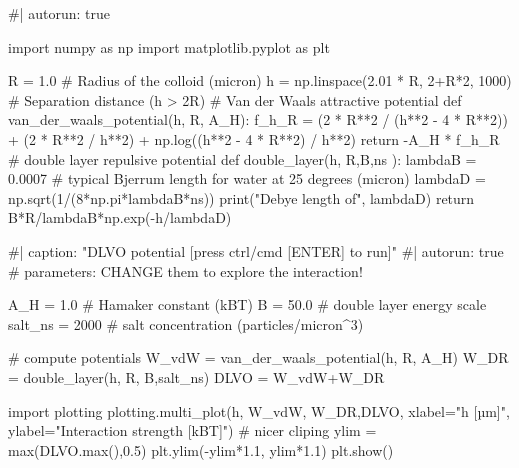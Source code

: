 \documentclass[
  letterpaper,
  enabledeprecatedfontcommands]{report}
\newenvironment{Shaded}{\begin{snugshade}}{\end{snugshade}}
\newcommand{\NormalTok}[1]{\textcolor[rgb]{0.00,0.23,0.31}{#1}}
\begin{document}
\begin{Shaded}
\begin{Highlighting}[]
\NormalTok{\#| autorun: true}

\NormalTok{import numpy as np}
\NormalTok{import matplotlib.pyplot as plt}

\NormalTok{R = 1.0  \# Radius of the colloid (micron) }
\NormalTok{h = np.linspace(2.01 * R, 2+R*2, 1000)  \# Separation distance (h \textgreater{} 2R)}
\NormalTok{\# Van der Waals attractive potential}
\NormalTok{def van\_der\_waals\_potential(h, R, A\_H):}
\NormalTok{    f\_h\_R = (2 * R**2 / (h**2 {-} 4 * R**2)) + (2 * R**2 / h**2) + np.log((h**2 {-} 4 * R**2) / h**2)}
\NormalTok{    return {-}A\_H * f\_h\_R}
\NormalTok{\# double layer repulsive potential}
\NormalTok{def double\_layer(h, R,B,ns ):}
\NormalTok{    lambdaB = 0.0007 \# typical Bjerrum length for water at 25 degrees (micron)}
\NormalTok{    lambdaD = np.sqrt(1/(8*np.pi*lambdaB*ns))}
\NormalTok{    print("Debye length of", lambdaD)}
\NormalTok{    return  B*R/lambdaB*np.exp({-}h/lambdaD)}

\end{Highlighting}
\end{Shaded}

\begin{Shaded}
\begin{Highlighting}[]
\NormalTok{\#| caption: "DLVO potential [press ctrl/cmd [ENTER] to run]"}
\NormalTok{\#| autorun: true}
\NormalTok{\# parameters: CHANGE them to explore the interaction!}

\NormalTok{A\_H = 1.0  \# Hamaker constant (kBT)}
\NormalTok{B = 50.0 \# double layer energy scale }
\NormalTok{salt\_ns = 2000 \# salt concentration (particles/micron\^{}3)}

\NormalTok{\# compute potentials}
\NormalTok{W\_vdW = van\_der\_waals\_potential(h, R, A\_H)}
\NormalTok{W\_DR = double\_layer(h, R, B,salt\_ns)}
\NormalTok{DLVO = W\_vdW+W\_DR}


\NormalTok{import plotting}
\NormalTok{plotting.multi\_plot(h, W\_vdW, W\_DR,DLVO,}
\NormalTok{    xlabel="h [µm]", ylabel="Interaction strength [kBT]")}
\NormalTok{\# nicer cliping}
\NormalTok{ylim  = max(DLVO.max(),0.5)}
\NormalTok{plt.ylim({-}ylim*1.1, ylim*1.1)}
\NormalTok{plt.show()}
\end{Highlighting}
\end{Shaded}
\end{document}
